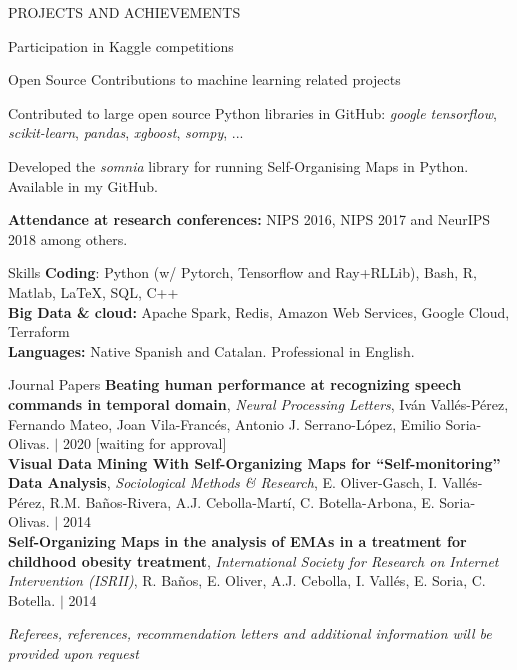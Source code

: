 \documentclass{resume} %
\begin{document}
\begin{rSection}{PROJECTS AND ACHIEVEMENTS}
\begin{rSubsection}{Participation in Kaggle competitions}
\end{rSubsection}

\vspace{-6pt}

\begin{rSubsection}{Open Source Contributions to machine learning related projects}
	{}{}{}  
	
	\vspace{-3pt}
	
	\item Contributed to large open source Python libraries in GitHub: \textit{google tensorflow}, \textit{scikit-learn}, \textit{pandas}, \textit{xgboost}, \textit{sompy}, ... 
	\item Developed the \textit{somnia} library for running Self-Organising Maps in Python. Available in my GitHub.
\end{rSubsection}

\vspace{-6pt}

\textbf{Attendance at research conferences:} NIPS 2016, NIPS 2017 and NeurIPS 2018 among others.


\end{rSection} 



\begin{rSection}{Skills} \itemsep -3pt  
{\textbf{Coding}: Python (w/ Pytorch, Tensorflow and Ray+RLLib), Bash, R, Matlab, \LaTeX, SQL, C++}  \\
{\textbf{Big Data \& cloud:} Apache Spark, Redis, Amazon Web Services, Google Cloud, Terraform} \\
{\textbf{Languages:} Native Spanish and Catalan. Professional in English.}
\end{rSection}  
 


\begin{rSection}{Journal Papers}
{\textbf{Beating human performance at recognizing speech commands in temporal domain}, \textit{Neural Processing Letters}, Iván Vallés-Pérez, Fernando Mateo, Joan Vila-Francés, Antonio J. Serrano-López, Emilio Soria-Olivas. $|$  {2020} [waiting for approval]}\\
{\textbf{Visual Data Mining With Self-Organizing Maps for ``Self-monitoring'' Data Analysis}, \textit{Sociological Methods \& Research}, E. Oliver-Gasch, I. Vallés-Pérez, R.M. Baños-Rivera, A.J. Cebolla-Martí, C. Botella-Arbona, E. Soria-Olivas. $|$  {2014}}\\
{\textbf{Self-Organizing Maps in the analysis of EMAs in a treatment for childhood obesity treatment}, \textit{International Society for Research on Internet Intervention (ISRII)}, R. Baños, E. Oliver, A.J. Cebolla, I. Vallés, E. Soria, C. Botella.  $|$  {2014}}

\end{rSection}

\vspace{-4pt}
\begin{flushright}
	\small{\textit{Referees, references, recommendation letters and additional information will be provided upon request}}
\end{flushright}
\end{document}
